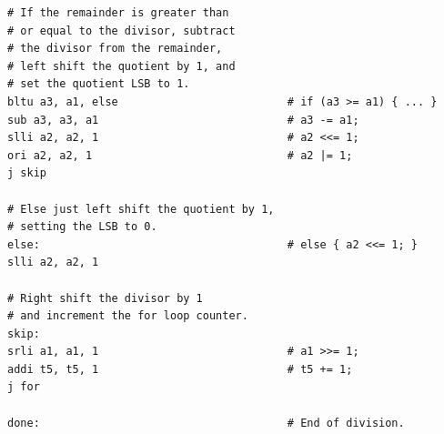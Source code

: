\documentclass[11pt]{article}
\begin{document}
\begin{Verbatim}
# If the remainder is greater than
# or equal to the divisor, subtract
# the divisor from the remainder, 
# left shift the quotient by 1, and
# set the quotient LSB to 1.
bltu a3, a1, else                          # if (a3 >= a1) { ... }
sub a3, a3, a1                             # a3 -= a1;
slli a2, a2, 1                             # a2 <<= 1;
ori a2, a2, 1                              # a2 |= 1;
j skip

# Else just left shift the quotient by 1,
# setting the LSB to 0.
else:                                      # else { a2 <<= 1; }
slli a2, a2, 1

# Right shift the divisor by 1
# and increment the for loop counter.
skip:
srli a1, a1, 1                             # a1 >>= 1;
addi t5, t5, 1                             # t5 += 1;
j for

done:                                      # End of division.
\end{Verbatim}
\end{document}
